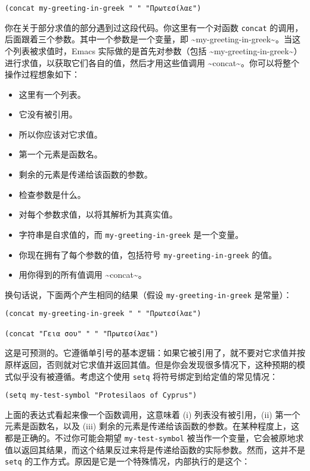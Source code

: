 \documentclass[11pt]{ctexart}
\begin{document}
\begin{verbatim}
(concat my-greeting-in-greek " " "Πρωτεσίλαε")
\end{verbatim}

你在关于部分求值的部分遇到过这段代码。你这里有一个对函数 \texttt{concat} 的调用，后面跟着三个参数。其中一个参数是一个变量，即 \textasciitilde{}my-greeting-in-greek\textasciitilde{}。当这个列表被求值时，Emacs 实际做的是首先对参数（包括 \textasciitilde{}my-greeting-in-greek\textasciitilde{}）进行求值，以获取它们各自的值，然后才用这些值调用 \textasciitilde{}concat\textasciitilde{}。你可以将整个操作过程想象如下：

\begin{itemize}
\item 这里有一个列表。
\item 它没有被引用。
\item 所以你应该对它求值。
\item 第一个元素是函数名。
\item 剩余的元素是传递给该函数的参数。
\item 检查参数是什么。
\item 对每个参数求值，以将其解析为其真实值。
\item 字符串是自求值的，而 \texttt{my-greeting-in-greek} 是一个变量。
\item 你现在拥有了每个参数的值，包括符号 \texttt{my-greeting-in-greek} 的值。
\item 用你得到的所有值调用 \textasciitilde{}concat\textasciitilde{}。
\end{itemize}

换句话说，下面两个产生相同的结果（假设 \texttt{my-greeting-in-greek} 是常量）：

\begin{verbatim}
(concat my-greeting-in-greek " " "Πρωτεσίλαε")

(concat "Γεια σου" " " "Πρωτεσίλαε")
\end{verbatim}

这是可预测的。它遵循单引号的基本逻辑：如果它被引用了，就不要对它求值并按原样返回，否则就对它求值并返回其值。但是你会发现很多情况下，这种预期的模式似乎没有被遵循。考虑这个使用 \texttt{setq} 将符号绑定到给定值的常见情况：

\begin{verbatim}
(setq my-test-symbol "Protesilaos of Cyprus")
\end{verbatim}

上面的表达式看起来像一个函数调用，这意味着 (i) 列表没有被引用，(ii) 第一个元素是函数名，以及 (iii) 剩余的元素是传递给该函数的参数。在某种程度上，这都是正确的。不过你可能会期望 \texttt{my-test-symbol} 被当作一个变量，它会被原地求值以返回其结果，而这个结果反过来将是传递给函数的实际参数。然而，这并不是 \texttt{setq} 的工作方式。原因是它是一个特殊情况，内部执行的是这个：
\end{document}
